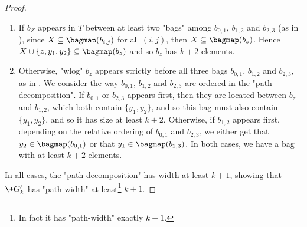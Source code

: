 \begin{proof}
	\begin{enumerate}
		\item If $b_Z$ appears in $T$ between at least two "bags" among $b_{0,1}$, $b_{1,2}$
		and $b_{2,3}$ (as in ), since $X \subseteq \bagmap(b_{i,j})$ for all $(i,j)$, then $X \subseteq \bagmap(b_z)$.
		Hence $X \cup \{z,y_1,y_2\} \subseteq \bagmap(b_z)$
		and so $b_z$ has $k+2$ elements.
		\item Otherwise, "wlog" $b_z$ appears strictly before all three bags
		$b_{0,1}$, $b_{1,2}$ and $b_{2,3}$, as in .
		We consider the way $b_{0,1}$, $b_{1,2}$ and $b_{2,3}$ are ordered in the "path decomposition". If $b_{0,1}$ or $b_{2,3}$ appears first, then 
		they are located between $b_z$ and $b_{1,2}$, which both contain $\{y_1,y_2\}$,
		and so this bag must also contain $\{y_1,y_2\}$, and so it has size at least $k+2$.
		Otherwise, if $b_{1,2}$ appears first, depending on the relative ordering
		of $b_{0,1}$ and $b_{2,3}$, we either get that $y_2 \in \bagmap(b_{0,1})$
		or that $y_1 \in \bagmap(b_{2,3})$. In both cases, we have a bag with at least
		$k+2$ elements.
	\end{enumerate}

	In all cases, the "path decomposition" has width at least $k+1$, showing that
	$\+G'_k$ has "path-width" at least\footnote{In fact it has "path-width" exactly $k+1$.} $k+1$.
\end{proof}